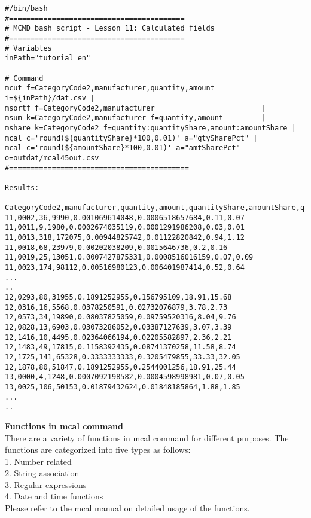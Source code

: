 \begin{verbatim}
#/bin/bash
#=========================================
# MCMD bash script - Lesson 11: Calculated fields
#=========================================
# Variables
inPath="tutorial_en"

# Command 
mcut f=CategoryCode2,manufacturer,quantity,amount           i=${inPath}/dat.csv |
msortf f=CategoryCode2,manufacturer                         |
msum k=CategoryCode2,manufacturer f=quantity,amount         |
mshare k=CategoryCode2 f=quantity:quantityShare,amount:amountShare | 
mcal c='round(${quantityShare}*100,0.01)' a="qtySharePct" |
mcal c='round(${amountShare}*100,0.01)' a="amtSharePct" o=outdat/mcal45out.csv
#==========================================

Results: 

CategoryCode2,manufacturer,quantity,amount,quantityShare,amountShare,qtySharePct,amtSharePct
11,0002,36,9990,0.001069614048,0.0006518657684,0.11,0.07
11,0011,9,1980,0.0002674035119,0.0001291986208,0.03,0.01
11,0013,318,172075,0.00944825742,0.01122820842,0.94,1.12
11,0018,68,23979,0.00202038209,0.0015646736,0.2,0.16
11,0019,25,13051,0.0007427875331,0.0008516016159,0.07,0.09
11,0023,174,98112,0.00516980123,0.006401987414,0.52,0.64
...
..
12,0293,80,31955,0.1891252955,0.156795109,18.91,15.68
12,0316,16,5568,0.0378250591,0.02732076879,3.78,2.73
12,0573,34,19890,0.08037825059,0.09759520316,8.04,9.76
12,0828,13,6903,0.03073286052,0.03387127639,3.07,3.39
12,1416,10,4495,0.02364066194,0.02205582897,2.36,2.21
12,1483,49,17815,0.1158392435,0.08741370258,11.58,8.74
12,1725,141,65328,0.3333333333,0.3205479855,33.33,32.05
12,1878,80,51847,0.1891252955,0.2544001256,18.91,25.44
13,0000,4,1248,0.0007092198582,0.0004598998981,0.07,0.05
13,0025,106,50153,0.01879432624,0.01848185864,1.88,1.85
...
..
\end{verbatim}

\vspace {5mm}

{\setlength{\parindent}{0cm}

\textbf{Functions in mcal command }\\

There are a variety of functions in mcal command for different purposes. The functions are categorized into five types as follows: \\
1. Number related \\
2. String association \\
3. Regular expressions  \\
4. Date and time functions \\
 
 Please refer to the mcal manual on detailed usage of the functions. 

}

